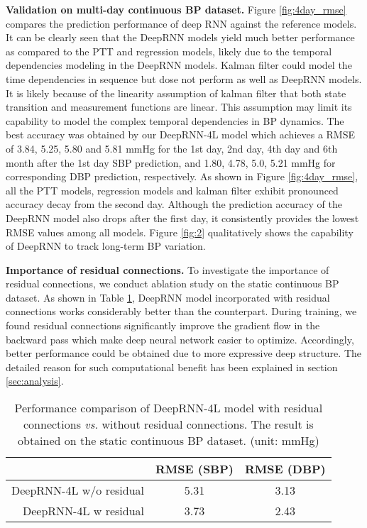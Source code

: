 \documentclass[letterpaper, 10 pt, conference]{ieeeconf}
\begin{document}
\textbf{Validation on multi-day continuous BP dataset.}
Figure \ref{fig:4day_rmse} compares the prediction performance of deep RNN against the reference models.
It can be clearly seen that the DeepRNN models yield much better performance as compared to the PTT and regression models, likely due to the temporal dependencies modeling in the DeepRNN models.
Kalman filter could model the time dependencies in sequence but dose not perform as well as DeepRNN models.
It is likely because of the linearity assumption of kalman filter that both state transition and measurement functions are linear.
This assumption may limit its capability to model the complex temporal dependencies in BP dynamics.
The best accuracy was obtained by our DeepRNN-4L model which achieves a RMSE of 3.84, 5.25, 5.80 and 5.81 mmHg for the 1st day, 2nd day, 4th day and 6th month after the 1st day SBP prediction, and 1.80, 4.78, 5.0, 5.21 mmHg for corresponding DBP prediction, respectively.
As shown in Figure \ref{fig:4day_rmse}, all the PTT models, regression models and kalman filter exhibit pronounced accuracy decay from the second day. 
Although the prediction accuracy of the DeepRNN model also drops after the first day, it consistently provides the lowest RMSE values among all models.
Figure \ref{fig:2} qualitatively shows the capability of DeepRNN to track long-term BP variation.


\textbf{Importance of residual connections.}
To investigate the importance of residual connections, we conduct ablation study on the static continuous BP dataset.
As shown in Table \ref{tab:residual}, DeepRNN model incorporated with residual connections works considerably better than the counterpart.
During training, we found residual connections significantly improve the gradient flow in the backward pass which make deep neural network easier to optimize.
Accordingly, better performance could be obtained due to more expressive deep structure.
The detailed reason for such computational benefit has been explained in section \ref{sec:analysis}.
 
 \begin{table}[]
 \centering
 \begin{tabular}{r|c|c}
 \hline
     		 & RMSE (SBP) & RMSE (DBP) \\ \hline \hline
 DeepRNN-4L w/o residual & 5.31          & 3.13       \\ \hline
 DeepRNN-4L w residual  & 3.73          & 2.43        \\ \hline
 \end{tabular}
 \caption{ Performance comparison of DeepRNN-4L model with residual connections \textit{vs.} without residual connections.
 The result is obtained on the static continuous BP dataset. (unit: mmHg)}
 \label{tab:residual}
 \end{table}
 
\end{document}
